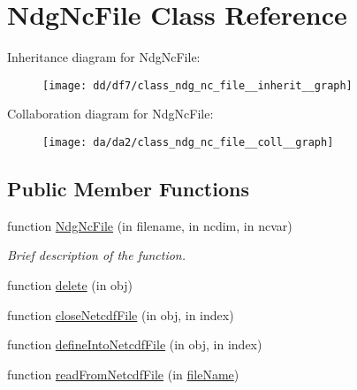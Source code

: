 \hypertarget{class_ndg_nc_file}{}\section{Ndg\+Nc\+File Class Reference}
\label{class_ndg_nc_file}


Inheritance diagram for Ndg\+Nc\+File\+:
\nopagebreak
\begin{figure}[H]
\begin{center}
\leavevmode
\texttt{[image: dd/df7/class\_ndg\_nc\_file\_\_inherit\_\_graph]}
\end{center}
\end{figure}


Collaboration diagram for Ndg\+Nc\+File\+:
\nopagebreak
\begin{figure}[H]
\begin{center}
\leavevmode
\texttt{[image: da/da2/class\_ndg\_nc\_file\_\_coll\_\_graph]}
\end{center}
\end{figure}
\subsection*{Public Member Functions}
\begin{DoxyCompactItemize}
\item 
function \hyperlink{class_ndg_nc_file_a7028e334feb15022de5a20ade786f8bc}{Ndg\+Nc\+File} (in filename, in ncdim, in ncvar)
\begin{DoxyCompactList}\small\item\em Brief description of the function. \end{DoxyCompactList}\item 
function \hyperlink{class_ndg_nc_file_ac456f77ae91eb6bd4fc20635b257363b}{delete} (in obj)
\item 
function \hyperlink{class_ndg_nc_file_a06b2ce1fa208fd87517d20c7a30ab6cd}{close\+Netcdf\+File} (in obj, in index)
\item 
function \hyperlink{class_ndg_nc_file_a356075e64bc6dac5aaf3e0c11665b7d2}{define\+Into\+Netcdf\+File} (in obj, in index)
\item 
function \hyperlink{class_ndg_nc_file_aaac8b0c980c5801b9ae0019a57ce0aab}{read\+From\+Netcdf\+File} (in \hyperlink{class_ndg_nc_file_adbba2e7998db4fcb4421efbc01a44e88}{file\+Name})
\end{DoxyCompactItemize}
